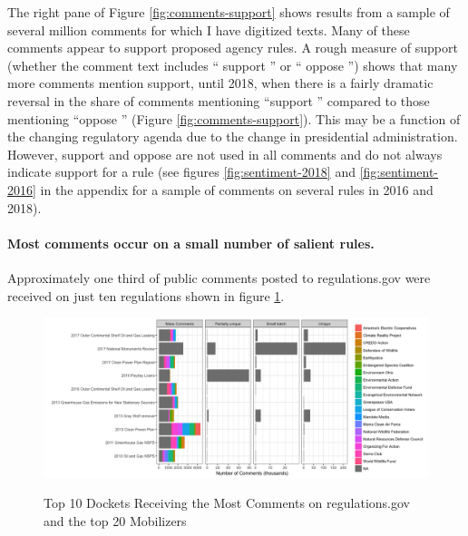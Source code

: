 The right pane of Figure \ref{fig:comments-support} shows results from a sample of several million comments for which I have digitized texts. Many of these comments appear to support proposed agency rules. A rough measure of support (whether the comment text includes `` support '' or `` oppose '') shows that many more comments mention support, until 2018, when there is a fairly dramatic reversal in the share of comments mentioning ``support '' compared to those mentioning ``oppose '' (Figure \ref{fig:comments-support}). This may be a function of the changing regulatory agenda due to the change in presidential administration. However, support and oppose are not used in all comments and do not always indicate support for a rule (see figures \ref{fig:sentiment-2018} and \ref{fig:sentiment-2016} in the appendix for a sample of comments on several rules in 2016 and 2018). 


\paragraph{Most comments occur on a small number of salient rules.} Approximately one third of public comments posted to regulations.gov were received on just ten regulations shown in figure \ref{fig:topdockets}.


\begin{figure}[h!]
    \centering
        \caption{Top 10 Dockets Receiving the Most Comments on regulations.gov and the top 20 Mobilizers}
    \includegraphics[width = 6in]{Figs/topdockets.png}
    \label{fig:topdockets}
\end{figure}

